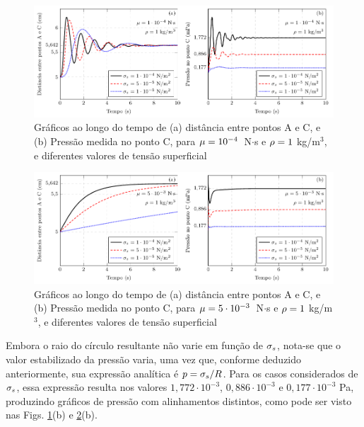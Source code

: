 \documentclass[Tese.tex]{subfiles}
\begin{document}
\begin{figure}[!htb]
	\centering
	\caption{Gráficos ao longo do tempo de (a) distância entre pontos A e C, e (b) Pressão medida no ponto C, para $\mu = 10^{-4}$~N$\cdot$s e $\rho = 1$ kg/m$^3$, e diferentes valores de tensão superficial}
	\label{fig:FluidDrop-surfaceTension}
	\includegraphics[scale=1.0]{Figuras/SurfaceTension2D/SurfaceTension2D-tension.pdf}
\end{figure}

\begin{figure}[!htb]
	\centering
	\caption{Gráficos ao longo do tempo de (a) distância entre pontos A e C, e (b) Pressão medida no ponto C, para $\mu = 5\cdot 10^{-3}$~N$\cdot$s e $\rho = 1$ kg/m$^3$, e diferentes valores de tensão superficial}
	\label{fig:FluidDrop-surfaceTension3}
	\includegraphics[scale=1.0]{Figuras/SurfaceTension2D/SurfaceTension2D-tension3.pdf}
\end{figure}

Embora o raio do círculo resultante não varie em função de $\sigma_s$, nota-se que o valor estabilizado da pressão varia, uma vez que, conforme deduzido anteriormente, sua expressão analítica é $p = \sigma_s/R$. Para os casos considerados de $\sigma_s$, essa expressão resulta nos valores $1,772\cdot 10^{-3}$, $0,886\cdot 10^{-3}$ e $0,177\cdot 10^{-3}$ Pa, produzindo gráficos de pressão com alinhamentos distintos, como pode ser visto nas Figs. \ref{fig:FluidDrop-surfaceTension}(b) e \ref{fig:FluidDrop-surfaceTension3}(b).
\end{document}

